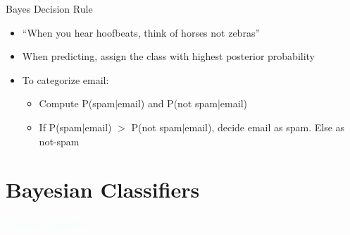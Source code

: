 \documentclass{beamer}
\newcommand{\thblue}[1]{{\Huge {\textcolor{azure}{#1}}}}
\begin{document}
\begin{frame}{Bayes Decision Rule}
    \begin{itemize}
        \item ``When you hear hoofbeats, think of horses not zebras''
        \item When predicting, assign the class with highest posterior probability
        \item To categorize email:
        \begin{itemize}
            \item Compute P(spam$|$email) and P(not spam$|$email)
            \item If P(spam$|$email) $>$ P(not spam$|$email), decide email as spam. Else as not-spam
        \end{itemize}
    \end{itemize}
\end{frame}


\section{Bayesian Classifiers}
\begin{frame}{} 
    \begin{center}
        \thblue{Bayesian Classifiers}
    \end{center}
\end{frame}
\end{document}

